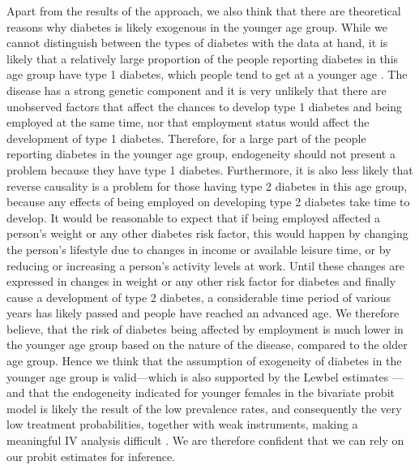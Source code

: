 Apart from the results of the \citeauthor{Lewbel2012} approach, we
also think that there are theoretical reasons why diabetes is likely
exogenous in the younger age group. While we cannot distinguish between
the types of diabetes with the data at hand, it is likely that a relatively
large proportion of the people reporting diabetes in this age group
have type 1 diabetes, which people tend to get at a younger age \parencite{Maahs2010}.
The disease has a strong genetic component and it is very unlikely
that there are unobserved factors that affect the chances to develop
type 1 diabetes and being employed at the same time, nor that employment
status would affect the development of type 1 diabetes. Therefore,
for a large part of the people reporting diabetes in the younger age
group, endogeneity should not present a problem because they have
type 1 diabetes. Furthermore, it is also less likely that reverse
causality is a problem for those having type 2 diabetes in this age
group, because any effects of being employed on developing type 2
diabetes take time to develop. It would be reasonable to expect that
if being employed affected a person's weight or any other diabetes
risk factor, this would happen by changing the person's lifestyle
due to changes in income or available leisure time, or by reducing
or increasing a person's activity levels at work. Until these changes
are expressed in changes in weight or any other risk factor for diabetes
and finally cause a development of type 2 diabetes, a considerable
time period of various years has likely passed and people have reached
an advanced age. We therefore believe, that the risk of diabetes being
affected by employment is much lower in the younger age group based
on the nature of the disease, compared to the older age group. Hence
we think that the assumption of exogeneity of diabetes in the younger
age group is valid---which is also supported by the Lewbel estimates
--- and that the endogeneity indicated for younger females in the
bivariate probit model is likely the result of the low prevalence
rates, and consequently the very low treatment probabilities, together
with weak instruments, making a meaningful \ac{IV} analysis difficult
\parencite{Chiburis2012}. We are therefore confident that we can rely
on our probit estimates for inference.

